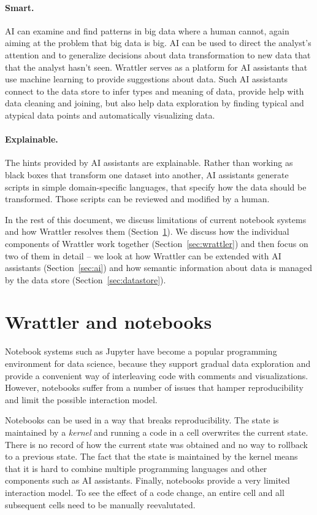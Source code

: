 \documentclass[sigplan,preprint,10pt]{acmart}\settopmatter{printfolios=true,printccs=false,printacmref=false}
\begin{document}
\paragraph{Smart.}
AI can examine and find patterns
in big data where a human cannot,
again aiming at the problem that
big data is big.
AI can be used to direct the analyst's attention and to generalize  decisions about data transformation
to new data that that the analyst
hasn't seen.
Wrattler serves as a platform for AI assistants that use machine learning to provide suggestions
about data. Such AI assistants connect to the data store to infer types and meaning of data, provide
help with data cleaning and joining, but also help data exploration by finding typical and atypical
data points and automatically visualizing data.

\paragraph{Explainable.}
The hints provided by AI assistants are explainable. Rather than working as black boxes that
transform one dataset into another, AI assistants generate scripts in simple domain-specific
languages, that specify how the data should be transformed. Those scripts can be reviewed
and modified by a human.

\vspace{0.5em}
\noindent
In the rest of this document, we discuss limitations of current notebook systems and how Wrattler
resolves them (Section~\ref{sec:overview}). We discuss how the individual components of Wrattler
work together (Section~\ref{sec:wrattler}) and then focus on two of them in detail --
we look at how Wrattler can be extended with AI assistants (Section~\ref{sec:ai}) and
how semantic information about data is managed by the data store (Section~\ref{sec:datastore}).


\section{Wrattler and notebooks}
\label{sec:overview}

Notebook systems such as Jupyter have become a popular programming environment for data science, because
they support gradual data exploration and provide a convenient way of interleaving code with
comments and visualizations. However, notebooks suffer from a number of issues that hamper
reproducibility and limit the possible interaction model.

Notebooks can be used in a way that breaks reproducibility. The state is maintained by a \emph{kernel}
and running a code in a cell overwrites the current state. There is no record of how the current
state was obtained and no way to rollback to a previous state. The fact that the state is
maintained by the kernel means that it is hard to combine multiple programming languages and
other components such as AI assistants. Finally, notebooks provide a very limited interaction
model. To see the effect of a code change, an entire cell and all subsequent cells need to be
manually reevalutated.
\end{document}
